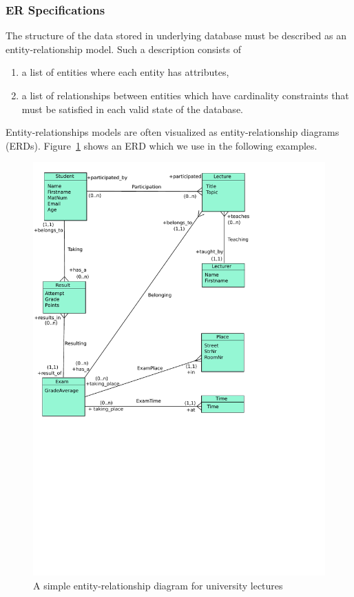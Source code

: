\subsubsection{ER Specifications}
\label{sec:erd2cdbi}

The structure of the data stored in underlying database
must be described as an entity-relationship model.
Such a description consists of
\begin{enumerate}
\item a list of entities where each entity has attributes,
\item a list of relationships between entities which have
      cardinality constraints that must be satisfied
      in each valid state of the database.
\end{enumerate}
%
Entity-relationships models are often visualized as
entity-relationship diagrams (ERDs).
Figure~\ref{fig:erd} shows an ERD which we use in the following examples.

\begin{figure}[t]
\begin{center}
  \includegraphics[trim= 0 320 120 0,scale=0.7, clip=true]{tooldocs/currypp/diagram.pdf}
\end{center}
\caption{A simple entity-relationship diagram for university lectures \cite{HanusKrone17EPTCS}}
\label{fig:erd}
\end{figure}


